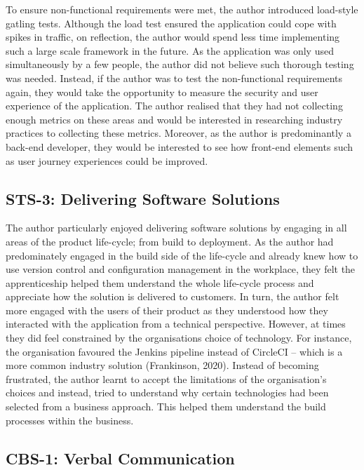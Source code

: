 \documentclass{article}
\begin{document}
To ensure non-functional requirements were met, the author introduced load-style gatling tests. Although the load test ensured the application could cope with spikes in traffic, on reflection, the author would spend less time implementing such a large scale framework in the future. As the application was only used simultaneously by a few people, the author did not believe such thorough testing was needed. Instead, if the author was to test the non-functional requirements again, they would take the opportunity to measure the security and user experience of the application. The author realised that they had not collecting enough metrics on these areas and would be interested in researching industry practices to collecting these metrics. Moreover, as the author is predominantly a back-end developer, they would be interested to see how front-end elements such as user journey experiences could be improved.

\subsection{STS-3: Delivering Software Solutions}

The author particularly enjoyed delivering software solutions by engaging in all areas of the product life-cycle; from build to deployment. As the author had predominately engaged in the build side of the life-cycle and already knew how to use version control and configuration management in the workplace, they felt the apprenticeship helped them understand the whole life-cycle process and appreciate how the solution is delivered to customers. In turn, the author felt more engaged with the users of their product as they understood how they interacted with the application from a technical perspective. However, at times they did feel constrained by the organisations choice of technology. For instance, the organisation favoured the Jenkins pipeline instead of CircleCI – which is a more common industry solution (Frankinson, 2020). Instead of becoming frustrated, the author learnt to accept the limitations of the organisation's choices and instead, tried to understand why certain technologies had been selected from a business approach. This helped them understand the build processes within the business.

\subsection{CBS-1: Verbal Communication}
\end{document}
